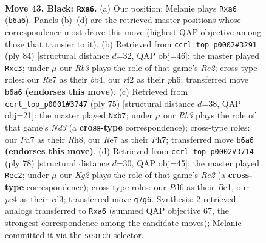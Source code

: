 \documentclass[11pt]{article}
\begin{document}
\clearpage

\begin{figure}[p]\centering
\begin{subfigure}{0.46\textwidth}\centering
\resizebox{\linewidth}{!}{%
\newchessgame
\chessboard[
  setfen={6B1/p3r1k1/Rr1p4/2p5/2P3P1/7K/4NR2/8 b - - 0 43},
  showmover=false,
  pgfstyle=straightmove, color=movearrow, markmove={b6-a6}
]}
\caption{}
\end{subfigure}\hfill
\begin{subfigure}{0.46\textwidth}\centering
\resizebox{\linewidth}{!}{%
\newchessgame
\chessboard[
  setfen={8/p5k1/1pB4p/8/1b6/1Pr3P1/P1R1K2P/8 w - - 17 43},
  showmover=false,
  pgfstyle=straightmove, color=movearrow, markmove={c2-c3}
]}
\caption{}
\end{subfigure}
\\[4pt]
\begin{subfigure}{0.46\textwidth}\centering
\resizebox{\linewidth}{!}{%
\newchessgame
\chessboard[
  setfen={7r/1R5p/3nrpkB/3N4/8/5K2/6PP/3R4 b - - 2 38},
  showmover=false,
  pgfstyle=straightmove, color=movearrow, markmove={d6-b7}
]}
\caption{}
\end{subfigure}\hfill
\begin{subfigure}{0.46\textwidth}\centering
\resizebox{\linewidth}{!}{%
\newchessgame
\chessboard[
  setfen={8/5pk1/p5p1/2r3P1/2R2P2/3rb2P/4R1K1/4B3 w - - 2 40},
  showmover=false,
  pgfstyle=straightmove, color=movearrow, markmove={e2-c2}
]}
\caption{}
\end{subfigure}
\caption{\textbf{Move 43, Black: \texttt{Rxa6}.} (a) Our position; Melanie plays \texttt{Rxa6} (\texttt{b6a6}). Panels (b)--(d) are the retrieved master positions whose correspondence most drove this move (highest QAP objective among those that transfer to it). (b) Retrieved from \texttt{ccrl\_top\_p0002\#3291} (ply 84) [structural distance $d$=32, QAP obj=46]: the master played \texttt{Rxc3}; under $\mu$ our \emph{Rb3} plays the role of that game's \emph{Rc2}; cross-type roles: our \emph{R}e7 as their \emph{b}b4, our \emph{r}f2 as their \emph{p}h6; transferred move \texttt{b6a6} \textbf{(endorses this move)}. (c) Retrieved from \texttt{ccrl\_top\_p0001\#3747} (ply 75) [structural distance $d$=38, QAP obj=21]: the master played \texttt{Nxb7}; under $\mu$ our \emph{Rb3} plays the role of that game's \emph{Nd3} (a \textbf{cross-type} correspondence); cross-type roles: our \emph{P}a7 as their \emph{R}h8, our \emph{R}e7 as their \emph{P}h7; transferred move \texttt{b6a6} \textbf{(endorses this move)}. (d) Retrieved from \texttt{ccrl\_top\_p0002\#3714} (ply 78) [structural distance $d$=30, QAP obj=45]: the master played \texttt{Rec2}; under $\mu$ our \emph{Kg2} plays the role of that game's \emph{Re2} (a \textbf{cross-type} correspondence); cross-type roles: our \emph{P}d6 as their \emph{B}e1, our \emph{p}c4 as their \emph{r}d3; transferred move \texttt{g7g6}. Synthesis: 2 retrieved analogs transferred to \texttt{Rxa6} (summed QAP objective 67, the strongest correspondence among the candidate moves); Melanie committed it via the \texttt{search} selector.}
\label{fig:thought-m85}
\end{figure}
\end{document}
